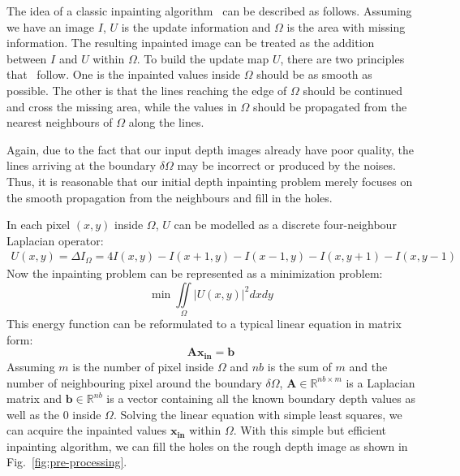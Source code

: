 The idea of a classic inpainting algorithm~\cite{bertalmio2000image} can be described as follows.
Assuming we have an image $I$, $U$ is the update information and $\Omega$ is the area with missing information.
The resulting inpainted image can be treated as the addition between $I$ and $U$ within $\Omega$. 
%
To build the update map $U$, there are two principles that~\cite{bertalmio2000image} follow.
One is the inpainted values inside $\Omega$ should be as smooth as possible. 
The other is that the lines reaching the edge of $\Omega$ should be continued and cross the missing area, while the values in $\Omega$ should be propagated from the nearest neighbours of $\Omega$ along the lines.

Again, due to the fact that our input depth images already have poor quality, the lines arriving at the boundary $\delta \Omega$ may be incorrect or produced by the noises.
Thus, it is reasonable that our initial depth inpainting problem merely focuses on the smooth propagation from the neighbours and fill in the holes.

In each pixel $(x, y)$ inside $\Omega$, $U$ can be modelled as a discrete four-neighbour Laplacian operator:
\begin{equation}
\begin{split}
U(x, y) = \Delta I_{\Omega}
                = 4I(x, y) - I(x + 1, y) - I(x - 1, y) - I(x, y+1) - I(x, y -1)
\end{split}
\end{equation}
Now the inpainting problem can be represented as a minimization problem: 
\begin{equation}
\min \iint\limits_{\Omega} |U(x,y)|^2 dxdy 
\end{equation}
This energy function can be reformulated to a typical linear equation in matrix form:
\begin{equation}
\mathbf{Ax_{in}=b}
\end{equation}
Assuming $m$ is the number of pixel inside $\Omega$ and $nb$ is the sum of $m$ and the number of neighbouring pixel around the boundary $\delta \Omega$, $\mathbf{A}\in\mathbb{R}^{nb\times m}$ is a Laplacian matrix and $\mathbf{b}\in\mathbb{R}^{nb}$ is a vector containing all the known boundary depth values as well as the $0$ inside $\Omega$.
Solving the linear equation with simple least squares, we can acquire the inpainted values $\mathbf{x_{in}}$ within $\Omega$.
With this simple but efficient inpainting algorithm, we can fill the holes on the rough depth image as shown in Fig.~\ref{fig:pre-processing}.

